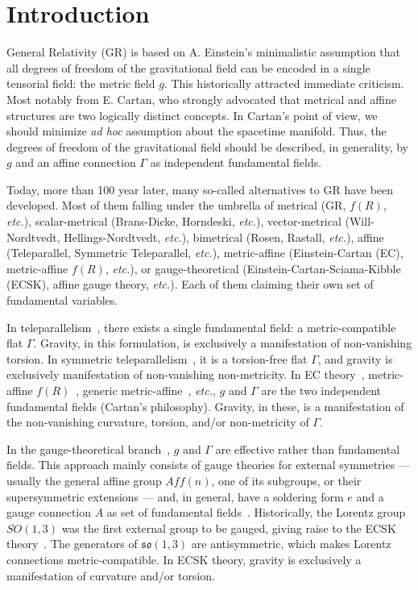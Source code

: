 \documentclass[../../main.tex]{subfiles}
\begin{document}
\section{Introduction}\label{sec:introduction}

General Relativity (GR) is based on A. Einstein's minimalistic assumption that all degrees of freedom of the gravitational field can be encoded in a single tensorial field: the metric field $g$. This historically attracted immediate criticism. Most notably from E. Cartan, who strongly advocated that metrical and affine structures are two logically distinct concepts. In Cartan's point of view, we should minimize \textit{ad hoc} assumption about the spacetime manifold. Thus, the degrees of freedom of the gravitational field should be described, in generality, by $g$ and an affine connection $\Gamma$ as independent fundamental fields.

Today, more than 100 year later, many so-called alternatives to GR have been developed. Most of them falling under the umbrella of metrical (GR, $f\left(R\right)$, \textit{etc.}), scalar-metrical (Brans-Dicke, Horndeski, \textit{etc.}), vector-metrical (Will-Nordtvedt, Hellings-Nordtvedt, \textit{etc.}), bimetrical (Rosen, Rastall, \textit{etc.}), affine (Teleparallel, Symmetric Teleparallel, \textit{etc.}), metric-affine (Einstein-Cartan (EC), metric-affine $f(R)$, \textit{etc.}), or gauge-theoretical (Einstein-Cartan-Sciama-Kibble (ECSK), affine gauge theory, \textit{etc.}). Each of them claiming their own set of fundamental variables.

In teleparallelism~\cite{aldrovandi2013,maluf2013}, there exists a single fundamental field: a metric-compatible flat $\Gamma$. Gravity, in this formulation, is exclusively a manifestation of non-vanishing torsion. In symmetric teleparallelism~\cite{ferraris1982a,nester1999}, it is a torsion-free flat $\Gamma$, and gravity is exclusively manifestation of non-vanishing non-metricity. In EC theory~\cite{hehl1974,hehl1976a,trautman2006}, metric-affine $f(R)$~\cite{sotiriou2007,sotiriou2009,sotiriou2010,olmo2011}, generic metric-affine~\cite{hehl1976b}, \textit{etc.}, $g$ and $\Gamma$ are the two independent fundamental fields (Cartan's philosophy). Gravity, in these, is a manifestation of the non-vanishing curvature, torsion, and/or non-metricity of $\Gamma$.

In the gauge-theoretical branch~\cite{sardanashvily1983,hehl1995,gronwald1995,gronwald1997,hehl2012}, $g$ and $\Gamma$ are effective rather than fundamental fields. This approach mainly consists of gauge theories for external symmetries --- usually the general affine group $Aff\left(n\right)$, one of its subgroups, or their supersymmetric extensions --- and, in general, have a soldering form $e$ and a gauge connection $A$ as set of fundamental fields~\cite{hehl1995}. Historically, the Lorentz group $SO\left(1,3\right)$ was the first external group to be gauged, giving raise to the ECSK theory~\cite{utiyama1956,kibble1961,sciama1962,sciama1964}. The generators of $\mathfrak{so}\left(1,3\right)$ are antisymmetric, which makes Lorentz connections metric-compatible. In ECSK theory, gravity is exclusively a manifestation of curvature and/or torsion.
\end{document}
